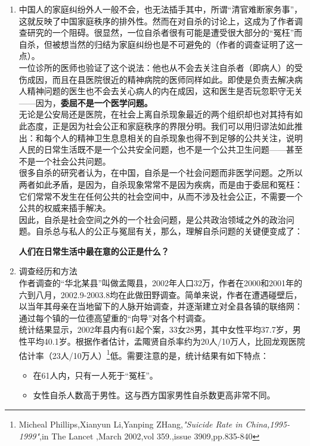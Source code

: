 \documentclass[UTF8]{book}
\begin{document}
\begin{enumerate}
    \item 中国人的家庭纠纷外人一般不会，也无法插手其中，所谓“清官难断家务事”，这就反映了中国家庭秩序的排外性。然而在对自杀的讨论上，这成为了作者调查研究的一个阻碍。很显然，一位自杀者很有可能是遭受很大部分的“冤枉”而自杀，但被想当然的归结为家庭纠纷也是不可避免的（作者的调查证明了这一点）。\\
    一位诊所的医师也验证了这个说法：他也从不会去关注自杀者（即病人）的受伤成因，而且在县医院很近的精神病院的医师同样如此。即使是负责去解决病人精神问题的医生也不会去关心病人的内在成因，这和医生是否玩忽职守无关——因为，\textbf{委屈不是一个医学问题。}\\
    无论是公安局还是医院，在社会上离自杀现象最近的两个组织却也对其持有如此态度，正是因为社会公正和家庭秩序的界限分明。我们可以用归谬法如此推出：和每个人的精神卫生息息相关的自杀现象也得不到足够的公共关注，说明人民的日常生活既不是一个公共安全问题，也不是一个公共卫生问题——甚至不是一个社会公共问题。\\
    很多自杀的研究者认为，在中国，自杀是一个社会问题而非医学问题。之所以两者如此矛盾，是因为，自杀现象常常不是因为疾病，而是由于委屈和冤枉：它们常常不发生在任何公共的社会空间中，从而不涉及社会公正，不需要一个公共的权威来插手解决。\\
    因此，自杀是社会空间之外的一个社会问题，是公共政治领域之外的政治问题。自杀总与私人的公正与冤屈有关，那么，理解自杀问题的关键便变成了：
    \begin{center}
        \textbf{人们在日常生活中最在意的公正是什么？}
    \end{center}
    \newpage
    \item {调查经历和方法}\\
        作者调查的“华北某县”叫做孟陬县，2002年人口32万，作者在2000和2001年的六到八月，2002.9-2003.8均在此做田野调查。简单来说，作者在遭遇碰壁后，以当年其母亲在当地留下的人脉开始调查，并逐渐建立对全县各镇的联络网：通过每个镇的一位德高望重的“向导”对各个村调查。\\
        统计结果显示，2002年县内有61起个案，33女28男，其中女性平均37.7岁，男性平均40.1岁。根据作者估计，孟陬贤自杀率约为20人/10万人，比回龙观医院估计率（23人/10万人）\footnote{Micheal Phillips,Xianyun Li,Yanping ZHang,\emph{"Suicide Rate in China,1995-1999"},in The Lancet ,March 2002,vol 359.,issue 3909,pp.835-840}低。需要注意的是，统计结果有如下特点：
        \begin{itemize}
            \item 在61人内，只有一人死于“冤枉”。
            \item 女性自杀人数高于男性。这与西方国家男性自杀数更高非常不同。

\end{itemize}
\end{enumerate}
\end{document}
